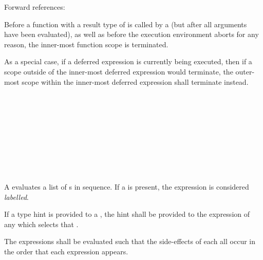 Forward references: 

\specsubsubitem
Before a function with a result type of  is called by a
 (but after all arguments have been evaluated), as
well as before the execution environment aborts for any reason, the inner-most
function scope is terminated.

\specsubsubitem
As a special case, if a deferred expression is currently being executed, then if
a scope outside of the inner-most deferred expression would terminate, the
outer-most scope within the inner-most deferred expression shall terminate
instead.



\begin{grammar}
 \\
	 \terminal{;}  \\
	 \terminal{;}  \\
	 \terminal{;}  \\

 \\
	 \terminal{\{}  \terminal{\}} \\

 \\
	\terminal{:}  \\
\end{grammar}

\specsubsubitem
A  evaluates a list of
s in sequence. If a  is present, the
expression is considered \textit{labelled}.

\specsubsubitem
If a type hint is provided to a , the hint shall
be provided to the expression of any  which
selects that .

\specsubsubitem
The expressions shall be evaluated such that the side-effects of each all occur
in the order that each expression appears.

